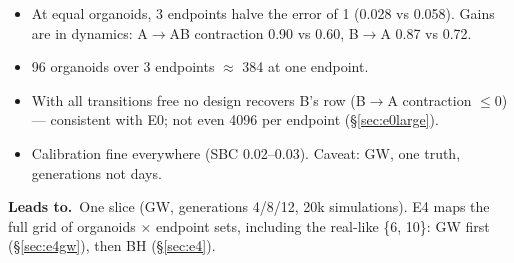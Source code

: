 \documentclass[10pt,a4paper]{article}
\newcommand{\blk}[1]{\par\needspace{5\baselineskip}\smallskip{\sffamily\bfseries\color{inkgray}#1}\par}
\newcommand{\Comment}{\blk{Comment}}
\newcommand{\Leads}[1]{\begin{leadbox}{\sffamily\bfseries\color{caqua!70!black}Leads to.}\ #1\end{leadbox}}
\renewcommand{\blk}[1]{\par\Needspace*{5\baselineskip}\smallskip{\sffamily\bfseries\color{inkgray}#1}\par}
\newcommand{\sref}[1]{\S\ref{#1}}
\begin{document}
\Comment
\begin{itemize}
\item At equal organoids, 3 endpoints halve the error of 1 (0.028 vs 0.058). Gains are in dynamics: A$\to$AB contraction 0.90 vs 0.60, B$\to$A 0.87 vs 0.72.
\item 96 organoids over 3 endpoints $\approx$ 384 at one endpoint.
\item With all transitions free no design recovers B's row (B$\to$A contraction $\le 0$) --- consistent with E0; not even 4096 per endpoint (\S\ref{sec:e0large}).
\item Calibration fine everywhere (SBC 0.02--0.03). Caveat: GW, one truth, generations not days.
\end{itemize}
\Leads{One slice (GW, generations 4/8/12, 20k simulations). E4 maps the full grid of organoids $\times$ endpoint sets, including the real-like \{6, 10\}: GW first (\sref{sec:e4gw}), then BH (\sref{sec:e4}).}
\end{document}
